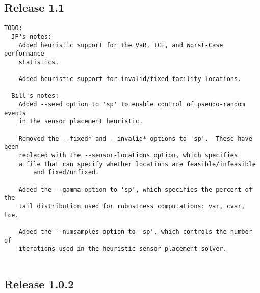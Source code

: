 \subsection{Release 1.1}\label{history_tevasp1_1_0}

\begin{verbatim}
TODO:
  JP's notes:
    Added heuristic support for the VaR, TCE, and Worst-Case performance 
    statistics. 

    Added heuristic support for invalid/fixed facility locations.

  Bill's notes:
    Added --seed option to 'sp' to enable control of pseudo-random events
	in the sensor placement heuristic.

    Removed the --fixed* and --invalid* options to 'sp'.  These have been
	replaced with the --sensor-locations option, which specifies
	a file that can specify whether locations are feasible/infeasible
        and fixed/unfixed.

    Added the --gamma option to 'sp', which specifies the percent of the
	tail distribution used for robustness computations: var, cvar, tce.

    Added the --numsamples option to 'sp', which controls the number of
	iterations used in the heuristic sensor placement solver.
    
\end{verbatim}

\subsection{Release 1.0.2}\label{history_tevasp1_0_2}

